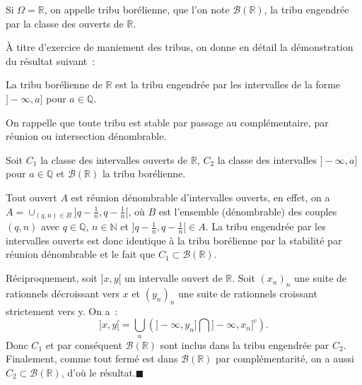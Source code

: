 \begin{definition}\label{I-bor}

Si \(\Omega = \mathbb{R}\), on appelle tribu borélienne, que l'on note
\(\mathcal{B}(\mathbb{R})\), la tribu engendrée par la classe des
ouverts de \(\mathbb{R}\).
\end{definition}

À titre d'exercice de maniement des tribus, on donne en détail la
démonstration du résultat suivant~:

\begin{proposition}\label{I-altbor}

La tribu borélienne de \(\mathbb{R}\) est la tribu engendrée par les
intervalles de la forme \(] - \infty, a]\) pour \(a \in \mathbb{Q}\).
\end{proposition}

\begin{preuve}
On rappelle que toute tribu est stable par passage au complémentaire,
par réunion ou intersection dénombrable.

Soit \(C_1\) la classe des intervalles ouverts de \(\mathbb{R}\),
\(C_2\) la classe des intervalles \(] - \infty, a]\) pour
\(a \in \mathbb{Q}\) et \(\mathcal{B}(\mathbb{R})\) la tribu borélienne.

Tout ouvert \(A\) est réunion dénombrable d'intervalles ouverts, en
effet, on a \(A = \cup_{(q,n)\in B} ]q -\frac{1}{n}, q -\frac{1}{n}[\),
où \(B\) est l'ensemble (dénombrable) des couples \((q,n)\) avec
\(q \in \mathbb{Q}\), \(n \in \mathbb{N}\) et
\(]q -\frac{1}{n}, q -\frac{1}{n}[ \in A\). La tribu engendrée par les
intervalles ouverts est donc identique à la tribu borélienne par la
stabilité par réunion dénombrable et le fait que
\(C_1 \subset \mathcal{B}(\mathbb{R})\).

Réciproquement, soit \(]x, y[\) un intervalle ouvert de \(\mathbb{R}\).
Soit \((x_n)_n\) une suite de rationnels décroissant vers \(x\) et
\((y_n)_n\) une suite de rationnels croissant strictement vers y. On a~:
\[ ]x, y[= \bigcup_n (] - \infty, y_n ]\bigcap ] - \infty, x_n ]^c ).\]
Donc \(C_1\) et par conséquent \(\mathcal{B}(\mathbb{R})\) sont inclus
dans la tribu engendrée par \(C_2\). Finalement, comme tout fermé est
dans \(\mathcal{B}(\mathbb{R})\) par complémentarité, on a aussi
\(C_2 \subset \mathcal{B}(\mathbb{R})\), d'où le
résultat.\hfill$\blacksquare$
\end{preuve}

